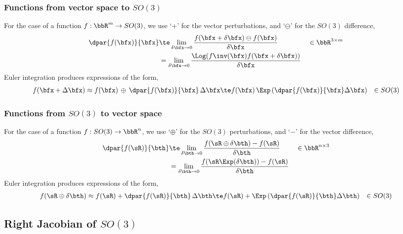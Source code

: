 \subsubsection{Functions from vector space to $SO(3)$}

For the case of a function $f:\bbR^m\to SO(3)$, we use `+' for the vector perturbations, and `$\ominus$' for the $SO(3)$ difference,
%
\begin{align}
\dpar{f(\bfx)}{\bfx} &\te \lim_{\delta\bfx\to0} \frac{ f(\bfx+\delta\bfx)\ominus f(\bfx)}{\delta\bfx} && \in \bbR^{3\times m} \label{equ:dif_RtoSO3}\\
&= \lim_{\delta\bfx\to0} \frac{\Log(f\inv(\bfx) f(\bfx+\delta\bfx))}{\delta\bfx}
\end{align}
%
Euler integration produces expressions of the form,
%
\begin{align*}
f(\bfx+\Delta\bfx) &\approx f(\bfx)\,\oplus\,\dpar{f(\bfx)}{\bfx}\,\Delta\bfx
 \te f(\bfx)\,\Exp\left(\dpar{f(\bfx)}{\bfx}\Delta\bfx\right)
 & \in SO(3)
\end{align*}

\subsubsection{Functions from $SO(3)$ to vector space}

For the case of a function $f: SO(3)\to\bbR^n$, we use `$\oplus$' for the $SO(3)$ perturbations, and `$-$' for the vector difference,
%
\begin{align}
\dpar{f(\sR)}{\bth} &\te \lim_{\delta\bth\to0} \frac{f(\sR\oplus\delta\bth) - f(\sR)}{\delta\bth} && \in \bbR^{n\times 3} \label{equ:jacobian_SO3_Rn}\\
&= \lim_{\delta\bth\to0} \frac{f(\sR\Exp(\delta\bth)) - f(\sR)}{\delta\bth}
\end{align}
%
Euler integration produces expressions of the form,
%
\begin{align*}
f(\sR\oplus\delta\bth) &\approx f(\sR)+\dpar{f(\sR)}{\bth}\,\Delta\bth
 \te f(\sR)+\Exp\left(\dpar{f(\sR)}{\bth}\Delta\bth\right)
 & \in SO(3)
\end{align*}


\subsection{Right Jacobian of $SO(3)$ }

